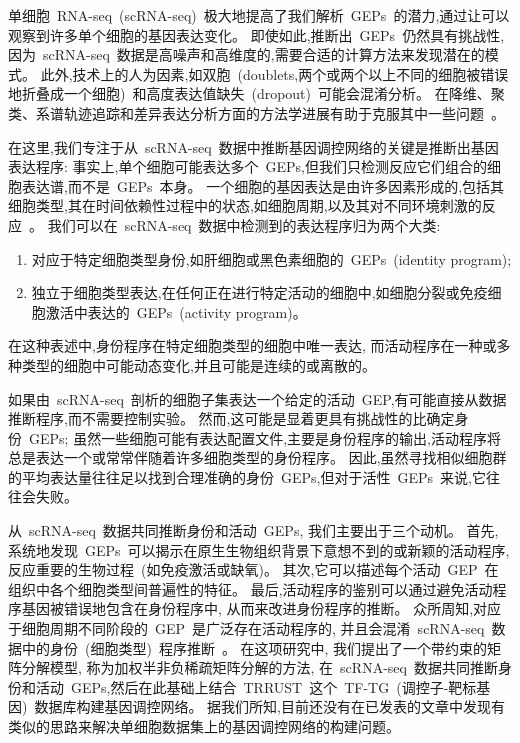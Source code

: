 单细胞~RNA-seq~(scRNA-seq)~极大地提高了我们解析~GEPs~的潜力,通过让可以观察到许多单个细胞的基因表达变化。
即使如此,推断出~GEPs~仍然具有挑战性,
因为~scRNA-seq~数据是高噪声和高维度的,需要合适的计算方法来发现潜在的模式。
此外,技术上的人为因素,如双胞~(doublets,两个或两个以上不同的细胞被错误地折叠成一个细胞)~和高度表达值缺失~(dropout)~可能会混淆分析。
在降维、聚类、系谱轨迹追踪和差异表达分析方面的方法学进展有助于克服其中一些问题~\cite{amir2013visne,kharchenko2014bayesian,satija2015spatial,trapnell2014dynamics}。

在这里,我们专注于从~scRNA-seq~数据中推断基因调控网络的关键是推断出基因表达程序:
事实上,单个细胞可能表达多个~GEPs,但我们只检测反应它们组合的细胞表达谱,而不是~GEPs~本身。
一个细胞的基因表达是由许多因素形成的,包括其细胞类型,其在时间依赖性过程中的状态,如细胞周期,以及其对不同环境刺激的反应~\cite{wagner2016revealing}。
我们可以在~scRNA-seq~数据中检测到的表达程序归为两个大类:
\begin{enumerate}
    \item 对应于特定细胞类型身份,如肝细胞或黑色素细胞的~GEPs~(identity program);
    \item 独立于细胞类型表达,在任何正在进行特定活动的细胞中,如细胞分裂或免疫细胞激活中表达的~GEPs~(activity program)。
\end{enumerate}
在这种表述中,身份程序在特定细胞类型的细胞中唯一表达,
而活动程序在一种或多种类型的细胞中可能动态变化,并且可能是连续的或离散的。

如果由~scRNA-seq~剖析的细胞子集表达一个给定的活动~GEP,有可能直接从数据推断程序,而不需要控制实验。
然而,这可能是显着更具有挑战性的比确定身份~GEPs;
虽然一些细胞可能有表达配置文件,主要是身份程序的输出,活动程序将总是表达一个或常常伴随着许多细胞类型的身份程序。
因此,虽然寻找相似细胞群的平均表达量往往足以找到合理准确的身份~GEPs,但对于活性~GEPs~来说,它往往会失败。

从~scRNA-seq~数据共同推断身份和活动~GEPs, 我们主要出于三个动机。
首先,系统地发现~GEPs~可以揭示在原生生物组织背景下意想不到的或新颖的活动程序,
反应重要的生物过程~(如免疫激活或缺氧)。
其次,它可以描述每个活动~GEP~在组织中各个细胞类型间普遍性的特征。
最后,活动程序的鉴别可以通过避免活动程序基因被错误地包含在身份程序中, 从而来改进身份程序的推断。
众所周知,对应于细胞周期不同阶段的~GEP~是广泛存在活动程序的,
并且会混淆~scRNA-seq~数据中的身份~(细胞类型)~程序推断~\cite{scialdone2015computational,chen2017controlling}。
在这项研究中, 我们提出了一个带约束的矩阵分解模型, 称为加权半非负稀疏矩阵分解的方法,
在~scRNA-seq~数据共同推断身份和活动~GEPs,然后在此基础上结合~TRRUST~这个~TF-TG~(调控子-靶标基因)~数据库构建基因调控网络。
据我们所知,目前还没有在已发表的文章中发现有类似的思路来解决单细胞数据集上的基因调控网络的构建问题。

